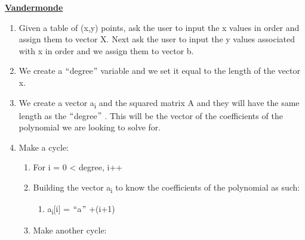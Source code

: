 \documentclass[12pt]{article}
\renewcommand{\_}{\kern-1.5pt\textunderscore\kern-1.5pt}
\begin{document}
{\fontsize{13pt}{15.6pt}\selectfont \textbf{\uline{Vandermonde}}\par}\par


\vspace{\baselineskip}
\begin{enumerate}
	\item {\fontsize{13pt}{15.6pt}\selectfont Given a table of (x,y) points, ask the user to input the x values in order and assign them to vector X. Next ask the user to input the y values associated with x in order and we assign them to vector b.\par}\par

	\item {\fontsize{13pt}{15.6pt}\selectfont We create a $``$degree$"$  variable and we set it equal to the length of the vector x.\par}\par

	\item {\fontsize{13pt}{15.6pt}\selectfont We create a vector a\textsubscript{i} and the squared matrix A and they will have the same length as the $``$degree$"$ . This will be the vector of the coefficients of the polynomial we are looking to solve for. \par}\par

	\item {\fontsize{13pt}{15.6pt}\selectfont Make a cycle:\par}\par

\begin{enumerate}
	\item {\fontsize{13pt}{15.6pt}\selectfont For i = 0 < degree, i++\par}\par

	\item {\fontsize{13pt}{15.6pt}\selectfont Building the vector a\textsubscript{i }to know the coefficients of the polynomial as such:\par}\par

\begin{enumerate}
	\item {\fontsize{13pt}{15.6pt}\selectfont a\textsubscript{i}[i] = $``$a\_$"$ +(i+1)\par}\par


\end{enumerate}
	\item {\fontsize{13pt}{15.6pt}\selectfont Make another cycle:\par}\par


\end{enumerate}
\end{enumerate}
\end{document}
